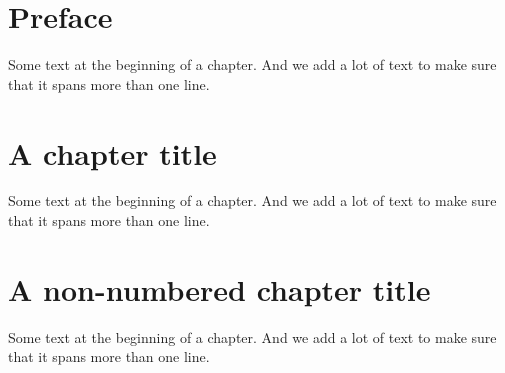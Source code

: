 \documentclass[openleft]{memoir}
\begin{document}
\frontmatter
\chapter{Preface}

Some text at the beginning of a chapter. And we add a lot of text to
make sure that it spans more than one line.

\mainmatter

\chapter{A chapter title}
Some text at the beginning of a chapter. And we add a lot of text to
make sure that it spans more than one line.

\chapter*{A non-numbered chapter title}
Some text at the beginning of a chapter. And we add a lot of text to
make sure that it spans more than one line.
\end{document}

